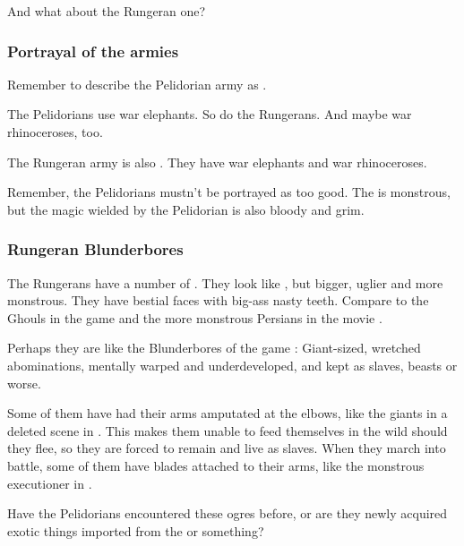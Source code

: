 \begin{garbage}
And what about the Rungeran one?









\subsubsection{Portrayal of the armies}
Remember to describe the Pelidorian army as . 

The Pelidorians use war elephants. 
So do the Rungerans. 
And maybe war rhinoceroses, too. 

The Rungeran army is also . 
They have war elephants and war rhinoceroses. 

Remember, the Pelidorians mustn't be portrayed as too good. 
The  is monstrous, but the magic wielded by the Pelidorian \ishrah{} is also bloody and grim.





\subsubsection{Rungeran Blunderbores}
The Rungerans have a number of . They look like \humans, but bigger, uglier and more monstrous. They have bestial faces with big-ass nasty teeth. Compare to the Ghouls in the game \cite{VideoGame:WarcraftIII} and the more monstrous Persians in the movie \cite{Movie:300}. 

Perhaps they are like the Blunderbores of the game \cite{VideoGame:DiabloII}: Giant-sized, wretched abominations, mentally warped and underdeveloped, and kept as slaves, beasts or worse. 

Some of them have had their arms amputated at the elbows, like the giants in a deleted scene in \cite{Movie:300}. This makes them unable to feed themselves in the wild should they flee, so they are forced to remain and live as slaves. 
When they march into battle, some of them have blades attached to their arms, like the monstrous executioner in \cite{Movie:300}.

Have the Pelidorians encountered these ogres before, or are they newly acquired exotic things imported from the  or something?






\end{garbage}
